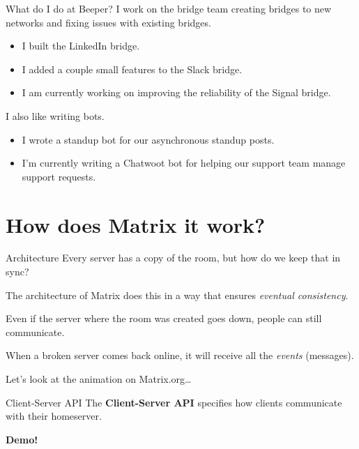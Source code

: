 \documentclass{acm}
\begin{document}
\begin{frame}{What do I do at Beeper?}
    I work on the bridge team creating bridges to new networks and fixing issues
    with existing bridges.

    \begin{itemize}
        \item I built the LinkedIn bridge.
        \item I added a couple small features to the Slack bridge.
        \item I am currently working on improving the reliability of the Signal
            bridge.
    \end{itemize}
    \pause

    I also like writing bots.

    \begin{itemize}
        \item I wrote a standup bot for our asynchronous standup posts.
        \item I'm currently writing a Chatwoot bot for helping our support team
            manage support requests.
    \end{itemize}
\end{frame}

\section{How does Matrix it work?}

\begin{frame}{Architecture}
    Every server has a copy of the room, but how do we keep that in sync?
    \pause

    The architecture of Matrix does this in a way that ensures \textit{eventual
    consistency}.
    \pause

    Even if the server where the room was created goes down, people can still
    communicate.

    When a broken server comes back online, it will receive all the
    \textit{events} (messages).
    \pause

    Let's look at the animation on Matrix.org\ldots
\end{frame}

\begin{frame}[fragile]{Client-Server API}
    The \textbf{Client-Server API} specifies how clients communicate with their
    homeserver.
    \pause
    \vspace{1in}

    \Huge
    \textbf{Demo!}
\end{frame}
\end{document}
